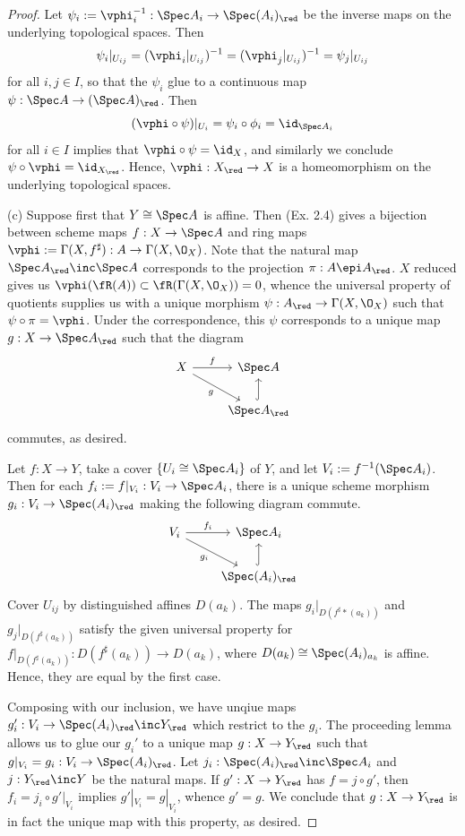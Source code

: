 \documentclass[12pt]{amsart}
\begin{document}
\begin{proof}
  Let $\psi_i:=\vphi_i^{-1}:\Spec A_i\to \Spec (A_i)_\red$ be the inverse maps on the underlying topological spaces.
  Then
  \[
    \psi_i|_{U_{ij}}=(\vphi_i|_{U_{ij}})^{-1} = (\vphi_j|_{U_{ij}})^{-1}= \psi_j|_{U_{ij}}
  \] 
  for all $i,j\in I$, so that the $\psi_i$ glue to a continuous map $\psi:\Spec A\to (\Spec A)_\red$.
  Then 
  \[
    (\vphi\circ\psi)|_{U_i}=\psi_i\circ\phi_i=\id_{\Spec A_i}
  \]
  for all $i\in I$ implies that $\vphi\circ \psi=\id_X$, and similarly we conclude $\psi\circ \vphi=\id_{X_\red}$.
  Hence, $\vphi:X_\red\to X$ is a homeomorphism on the underlying topological spaces.

  (c) Suppose first that $Y\cong \Spec A$ is affine.
  Then (Ex. 2.4) gives a bijection between scheme maps $f:X\to \Spec A$ and ring maps $\vphi:=\Gamma(X,f^\sharp):A\to \Gamma(X,\O_X)$.
  Note that the natural map $\Spec A_\red\inc \Spec A$ corresponds to the projection $\pi:A\epi A_\red$.
  $X$ reduced gives us $\vphi(\fR(A))\subset\fR(\Gamma(X,\O_X))=0$, whence the universal property of quotients supplies us with a unique morphism $\psi:A_\red\to \Gamma(X,\O_X)$ such that $\psi\circ \pi= \vphi$.
  Under the correspondence, this $\psi$ corresponds to a unique map $g:X\to \Spec A_\red$ such that the diagram
  \[
    \begin{tikzcd}
    X\ar[dr,"g"']\ar[r,"f"] & \Spec A\\
                & \Spec A_\red\ar[u,hook]
    \end{tikzcd}
  \] 
  commutes, as desired.

  Let $f:X\to Y$, take a cover $\{U_i\cong \Spec A_i\}$ of $Y$, and let $V_i:= f^{-1}(\Spec A_i)$.
  Then for each $f_i:=f|_{V_i}:V_i\to \Spec A_i$, there is a unique scheme morphism $g_i:V_i\to \Spec (A_i)_\red$ making the following diagram commute.
  \[
    \begin{tikzcd}
    V_i\ar[dr,"g_i"']\ar[r,"f_i"] & \Spec A_i\\
                & \Spec (A_i)_\red\ar[u,hook]
    \end{tikzcd}
  \] 
  Cover $U_{ij}$ by distinguished affines $D(a_k)$. 
  The maps $g_i|_{D(f^\sharp *(a_k))}$ and $g_j|_{D(f^\sharp(a_k))}$ satisfy the given universal property for $f|_{D(f^\sharp(a_k))}:D(f^\sharp(a_k))\to D(a_k)$, where $D(a_k)\cong \Spec (A_i)_{a_k}$ is affine.
  Hence, they are equal by the first case.

  Composing with our inclusion, we have unqiue maps $g_i':V_i\to \Spec (A_i)_\red\inc Y_\red$ which restrict to the $g_i$.
  The proceeding lemma allows us to glue our $g_i'$ to a unique map $g:X\to Y_\red$ such that $g|_{V_i}=g_i:V_i\to \Spec (A_i)_\red$.
  Let $j_i:\Spec (A_i)_\red\inc \Spec A_i$ and $j:Y_\red\inc Y$ be the natural maps.
  If $g':X\to Y_\red$ has $f=j\circ g'$, then $f_i=j_i \circ g'|_{V_i}$ implies $g'|_{V_i}=g|_{V_i}$, whence $g'=g$.%
  We conclude that $g:X\to Y_\red$ is in fact the unique map with this property, as desired.
\end{proof}
\end{document}
